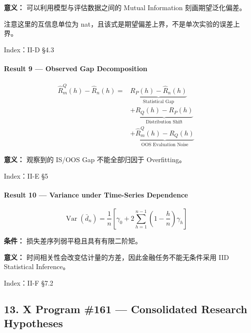 \textbf{意义：} 可以利用模型与评估数据之间的 Mutual Information 刻画期望泛化偏差。

注意这里的互信息单位为 nat，且该式是期望偏差上界，不是单次实验的误差上界。

Index：II-D §4.3

\hypertarget{part-2-27-0001-result-9-observed-gap-decomposition}{%
\paragraph{Result 9 --- Observed Gap Decomposition}\label{part-2-27-0001-result-9-observed-gap-decomposition}}

\[\boxed{
\begin{aligned}
\widehat R_m^Q(h)-\widehat R_n(h)
={}&
\underbrace{R_P(h)-\widehat R_n(h)}
_{\text{Statistical Gap}}\\
&+
\underbrace{R_Q(h)-R_P(h)}
_{\text{Distribution Shift}}\\
&+
\underbrace{\widehat R_m^Q(h)-R_Q(h)}
_{\text{OOS Evaluation Noise}}
\end{aligned}
}\]

\textbf{意义：} 观察到的 IS/OOS Gap 不能全部归因于 Overfitting。

Index：II-E §5

\hypertarget{part-2-27-0001-result-10-variance-under-time-series-dependence}{%
\paragraph{Result 10 --- Variance under Time-Series Dependence}\label{part-2-27-0001-result-10-variance-under-time-series-dependence}}

\[\boxed{
\operatorname{Var}(\bar d_n)
=
\frac1n
\left[
\gamma_0+
2\sum_{h=1}^{n-1}
\left(1-\frac hn\right)\gamma_h
\right]
}\]

\textbf{条件：} 损失差序列弱平稳且具有有限二阶矩。

\textbf{意义：} 时间相关性会改变估计量的方差，因此金融任务不能无条件采用 IID Statistical Inference。

Index：II-F §7.2

\hypertarget{part-2-27-0001-x-program-161-consolidated-research-hypotheses}{%
\subsection{13. X Program \#161 --- Consolidated Research Hypotheses}\label{part-2-27-0001-x-program-161-consolidated-research-hypotheses}}

